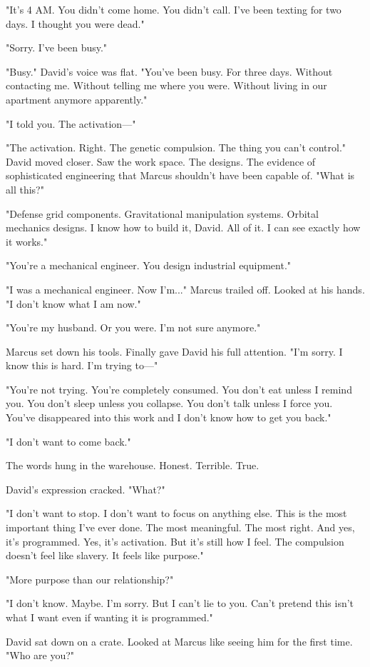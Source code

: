 "It's 4 AM. You didn't come home. You didn't call. I've been texting for two days. I thought you were dead."

"Sorry. I've been busy."

"Busy." David's voice was flat. "You've been busy. For three days. Without contacting me. Without telling me where you were. Without living in our apartment anymore apparently."

"I told you. The activation—"

"The activation. Right. The genetic compulsion. The thing you can't control." David moved closer. Saw the work space. The designs. The evidence of sophisticated engineering that Marcus shouldn't have been capable of. "What is all this?"

"Defense grid components. Gravitational manipulation systems. Orbital mechanics designs. I know how to build it, David. All of it. I can see exactly how it works."

"You're a mechanical engineer. You design industrial equipment."

"I was a mechanical engineer. Now I'm..." Marcus trailed off. Looked at his hands. "I don't know what I am now."

"You're my husband. Or you were. I'm not sure anymore."

Marcus set down his tools. Finally gave David his full attention. "I'm sorry. I know this is hard. I'm trying to—"

"You're not trying. You're completely consumed. You don't eat unless I remind you. You don't sleep unless you collapse. You don't talk unless I force you. You've disappeared into this work and I don't know how to get you back."

"I don't want to come back."

The words hung in the warehouse. Honest. Terrible. True.

David's expression cracked. "What?"

"I don't want to stop. I don't want to focus on anything else. This is the most important thing I've ever done. The most meaningful. The most right. And yes, it's programmed. Yes, it's activation. But it's still how I feel. The compulsion doesn't feel like slavery. It feels like purpose."

"More purpose than our relationship?"

"I don't know. Maybe. I'm sorry. But I can't lie to you. Can't pretend this isn't what I want even if wanting it is programmed."

David sat down on a crate. Looked at Marcus like seeing him for the first time. "Who are you?"


